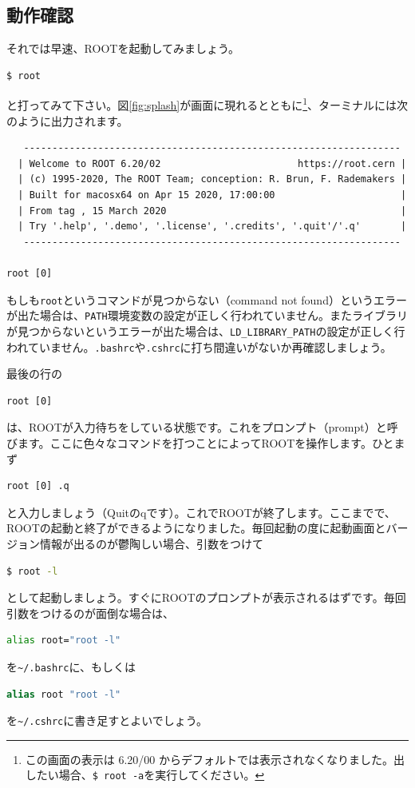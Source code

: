 {\subsection{動作確認}

それでは早速、ROOTを起動してみましょう。
\begin{lstlisting}[language=bash]
$ root
\end{lstlisting}
と打ってみて下さい。図\ref{fig:splash}が画面に現れるとともに\footnote{この画面の表示は 6.20/00 からデフォルトでは表示されなくなりました。出したい場合、\texttt{\$ root -a}を実行してください。}、ターミナルには次のように出力されます。
\begin{lstlisting}
   ------------------------------------------------------------------
  | Welcome to ROOT 6.20/02                        https://root.cern |
  | (c) 1995-2020, The ROOT Team; conception: R. Brun, F. Rademakers |
  | Built for macosx64 on Apr 15 2020, 17:00:00                      |
  | From tag , 15 March 2020                                         |
  | Try '.help', '.demo', '.license', '.credits', '.quit'/'.q'       |
   ------------------------------------------------------------------

root [0] 
\end{lstlisting}
もしも\texttt{root}というコマンドが見つからない（command not found）というエラーが出た場合は、\texttt{PATH}環境変数の設定が正しく行われていません。またライブラリが見つからないというエラーが出た場合は、\texttt{LD\_LIBRARY\_PATH}の設定が正しく行われていません。\texttt{.bashrc}や\texttt{.cshrc}に打ち間違いがないか再確認しましょう。

最後の行の
\begin{lstlisting}
root [0]
\end{lstlisting}
は、ROOTが入力待ちをしている状態です。これをプロンプト（prompt）と呼びます。ここに色々なコマンドを打つことによってROOTを操作します。ひとまず
\begin{lstlisting}
root [0] .q
\end{lstlisting}
と入力しましょう（Quitのqです）。これでROOTが終了します。ここまでで、ROOTの起動と終了ができるようになりました。毎回起動の度に起動画面とバージョン情報が出るのが鬱陶しい場合、引数をつけて
\begin{lstlisting}[language=bash]
$ root -l
\end{lstlisting}
として起動しましょう。すぐにROOTのプロンプトが表示されるはずです。毎回引数をつけるのが面倒な場合は、
\begin{lstlisting}[language=bash]
alias root="root -l"
\end{lstlisting}
を\texttt{\~{}/.bashrc}に、もしくは
\begin{lstlisting}[language=csh]
alias root "root -l"
\end{lstlisting}
を\texttt{\~{}/.cshrc}に書き足すとよいでしょう。

}
